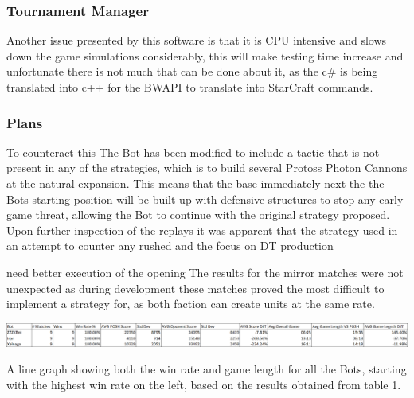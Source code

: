 \documentclass[journal]{IEEEtran}
\begin{document}
\subsubsection{Tournament Manager}
Another issue presented by this software is that it is CPU intensive and slows down the game simulations considerably, this will make testing time increase and unfortunate there is not much that can be done about it, as the c\# is being translated into c++ for the BWAPI to translate into StarCraft commands.

\subsubsection{Plans}
To counteract this The Bot has been modified to include a tactic that is not present in any of the strategies, which is to build several Protoss Photon Cannons at the natural expansion. This means that the base immediately next the the Bots starting position will be built up with defensive structures to stop any early game threat, allowing the Bot to continue with the original strategy proposed.
Upon further inspection of the replays it was apparent that the strategy used in an attempt to counter any rushed and the focus on DT production

need better execution of the opening
The results for the mirror matches were not unexpected as during development these matches proved the most difficult to implement a strategy for, as both faction can create units at the same rate.
\begin{table}
	\centering
	\includegraphics[width=\textwidth]{PvsBots}
	\caption{A line graph showing both the win rate and game length for all the Bots, starting with the highest win rate on the left, based on the results obtained from table 1.}
	\label{Table6}
\end{table}
\end{document}
